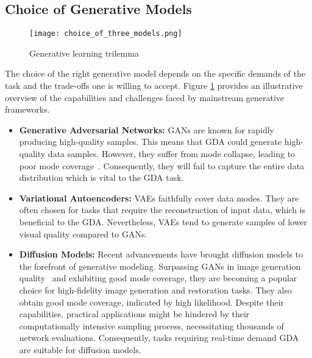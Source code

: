 \documentclass[preprint,12pt,authoryear]{elsarticle}
\begin{document}
\subsection{Choice of Generative Models}
\begin{figure}
    \centering
    \centerline{\texttt{[image: choice\_of\_three\_models.png]}}
    \caption{Generative learning trilemma\cite{95_trilemma} }
    \label{fig:trade_off}
\end{figure}
 The choice of the right generative model depends on the specific demands of the task and the trade-offs one is willing to accept. Figure \ref{fig:trade_off} provides an illustrative overview of the capabilities and challenges faced by mainstream generative frameworks.

\begin{itemize}
    \item \textbf{Generative Adversarial Networks:} GANs are known for rapidly producing high-quality samples. This means that GDA could generate high-quality data samples. However, they suffer from mode collapse, leading to poor mode coverage~\cite {96_gan_fail, 97_gan_fail}. Consequently, they will fail to capture the entire data distribution which is vital to the GDA task.
    
    \item \textbf{Variational Autoencoders:} VAEs faithfully cover data modes. They are often chosen for tasks that require the reconstruction of input data, which is beneficial to the GDA. Nevertheless, VAEs tend to generate samples of lower visual quality compared to GANs.\cite{95_trilemma}
    

    \item \textbf{Diffusion Models:} Recent advancements have brought diffusion models to the forefront of generative modeling. Surpassing GANs in image generation quality~\citep{41_Diffusion,100_diffusion_good} and exhibiting good mode coverage, they are becoming a popular choice for high-fidelity image generation and restoration tasks. They also obtain good mode coverage, indicated by high likelihood.\cite{98_diffusion_good,99_diffusion_good,101_diffusion_good} Despite their capabilities, practical applications might be hindered by their computationally intensive sampling process, necessitating thousands of network evaluations. Consequently, tasks requiring real-time demand GDA are suitable for diffusion models.
    

\end{itemize}
\end{document}
